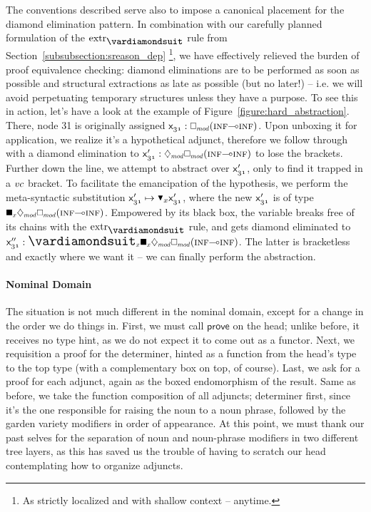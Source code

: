 The conventions described serve also to impose a canonical placement for the diamond elimination pattern.
In combination with our carefully planned formulation of the $\Extraction$ rule from Section~\ref{subsubsection:sreason_dep}%
	\footnote{As strictly localized and with shallow context -- anytime.},
we have effectively relieved the burden of proof equivalence checking: diamond eliminations are to be performed as soon as possible and structural extractions as late as possible (but no later!) -- i.e. we will avoid perpetuating temporary structures unless they have a purpose.
To see this in action, let's have a look at the example of Figure~\ref{figure:hard_abstraction}.
There, node 31 is originally assigned $\Var{31} : \dbox{mod}(\infp[s]\li\infp[s])$.
Upon unboxing it for application, we realize it's a hypothetical adjunct, therefore we follow through with a diamond elimination to $\Var{31}' : \ddia{mod}\dbox{mod}(\infp[s]\li\infp[s])$ to lose the  brackets.
Further down the line, we attempt to abstract over $\mathsf{x}_{\mathnormal{31}}'$, only to find it trapped in a $\mathnormal{vc}$ bracket.
To facilitate the emancipation of the hypothesis, we perform the meta-syntactic substitution $\Var{31}' \mapsto \dboxelim{x}\Var{31}'$, where the new $\mathsf{x}_{\mathnormal{31}}'$ is of type $\dxbox{x}\ddia{mod}\dbox{mod}(\infp[s]\li\infp[s])$.
Empowered by its black box, the variable breaks free of its chains with the $\Extraction$ rule, and gets diamond eliminated to $\Var{31}'' : \dxdia{x}\dxbox{x}\ddia{mod}\dbox{mod}(\infp[s]\li\infp[s])$.
The latter is bracketless and exactly where we want it -- we can finally perform the abstraction.

\paragraph{Nominal Domain}
The situation is not much different in the nominal domain, except for a change in the order we do things in.
First, we must call $\mathsf{prove}$ on the head; unlike before, it receives no type hint, as we do not expect it to come out as a functor.
Next, we requisition a proof for the determiner, hinted as a function from the head's type to the top type (with a complementary box on top, of course).
Last, we ask for a proof for each adjunct, again as the boxed endomorphism of the result.
Same as before, we take the function composition of all adjuncts; determiner first, since it's the one responsible for raising the noun to a noun phrase, followed by the garden variety modifiers in order of appearance.
At this point, we must thank our past selves for the separation of noun and noun-phrase modifiers in two different tree layers, as this has saved us the trouble of having to scratch our head contemplating how to organize adjuncts.

